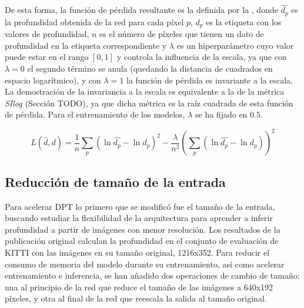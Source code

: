 De esta forma, la función de pérdida resultante es la definida por la , donde $\hat{d_p}$ es la profundidad obtenida de la red para cada píxel $p$, $d_p$ es la etiqueta con los valores de profundidad, $n$ es el número de píxeles que tienen un dato de profundidad en la etiqueta correspondiente y $\lambda$ es un hiperparámetro cuyo valor puede estar en el rango $[0, 1]$ y controla la influencia de la escala, ya que con $\lambda=0$ el segundo término se anula (quedando la distancia de cuadrados en espacio logarítmico), y con $\lambda=1$ la función de pérdida es invariante a la escala. La demostración de la invariancia a la escala es equivalente a la de la métrica \textit{SIlog} (Sección TODO), ya que dicha métrica es la raíz cuadrada de esta función de pérdida. Para el entrenamiento de los modelos, $\lambda$ se ha fijado en $0.5$.

\begin{equation}
\label{eqn:perdida-midas}
L(\hat{d}, d) = \frac{1}{n}\sum_{p} (\ln{\hat{d_p}} - \ln{d_p})^2 - \frac{\lambda}{n^2} \left( \sum_{p} (\ln{\hat{d_p}} - \ln{d_p}) \right)^2
\end{equation}

\subsection{Reducción de tamaño de la entrada}
Para acelerar DPT lo primero que se modificó fue el tamaño de la entrada, buscando estudiar la flexibilidad de la arquitectura para aprender a inferir profundidad a partir de imágenes con menor resolución. Los resultados de la publicación original calculan la profundidad en el conjunto de evaluación de KITTI con las imágenes en su tamaño original, 1216x352. Para reducir el consumo de memoria del modelo durante su entrenamiento, así como acelerar entrenamiento e inferencia, se han añadido dos operaciones de cambio de tamaño: una al principio de la red que reduce el tamaño de las imágenes a 640x192 píxeles, y otra al final de la red que reescala la salida al tamaño original. 


